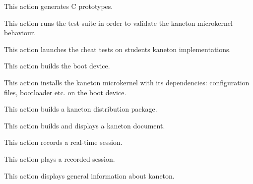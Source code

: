 	{
	  This action generates C prototypes.

	  \-

	}

	{
	  This action runs the test suite in order to validate the kaneton
	  microkernel behaviour.

	  \-

	}

	{
	  This action launches the cheat tests on students kaneton
	  implementations.

	  \-


	  \-

	}

	{
	  This action builds the boot device.

	  \-

	}

	{
	  This action installs the kaneton microkernel with its dependencies:
	  configuration files, bootloader etc. on the boot device.

	  \-

	}

	{
	  This action builds a kaneton distribution package.

	  \-


	  \-


	  \-

	}

	{
	  This action builds and displays a kaneton document.

	  \-


	  \-


	  \-

	}

	{
	  This action records a real-time session.

	  \-


	  \-

	}

	{
	  This action plays a recorded session.

	  \-


	  \-


	  \-

	}

	{
	  This action displays general information about kaneton.

	  \-

	}
